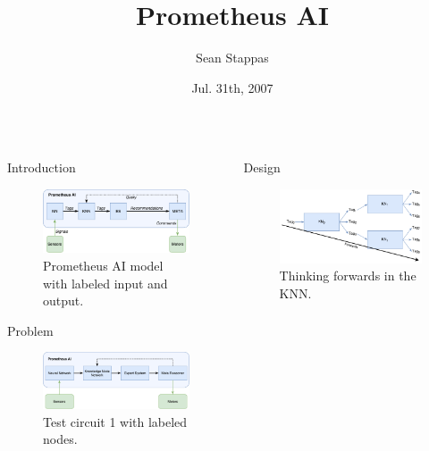 \documentclass[final]{beamer} %
\title[Fancy Posters]{Prometheus AI}
\author{Sean Stappas}
\institute[RWTH Aachen University]{McGill University}
\date{Jul. 31th, 2007}
\begin{document}
\begin{columns}
	\begin{column}{.3\textwidth}
			\begin{block}{Introduction}
				\begin{figure}[!htb]
					\includegraphics[width=\textwidth]{figures/ai_model_labeled.pdf}
					\caption{Prometheus AI model with labeled input and output.}
					\label{model_labeled}
				\end{figure}
			\end{block}
			\begin{block}{Problem}
				\begin{figure}[!htb]
					\centering
					\includegraphics[width=0.5\columnwidth]{figures/ai_model.pdf}
					\caption
					{Test circuit 1 with labeled nodes.}
				\end{figure}
			\end{block}
	\end{column}
	\begin{column}{.3\textwidth}
		\begin{block}{Design}
			
			\begin{figure}[!htb]
				\includegraphics[width=0.5\columnwidth]{figures/forwards_thinking.pdf}
				\caption{Thinking forwards in the KNN.}
				\label{think_forwards}
			\end{figure}
		

\end{block}
\end{column}
\end{columns}
\end{document}
